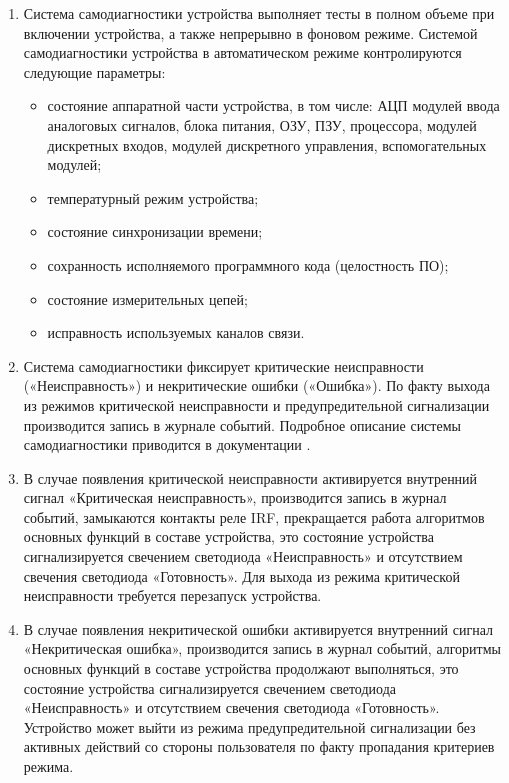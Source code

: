 \begin{enumerate}[label=\arabic{section}.\arabic{subsection}.\arabic*, labelsep=7pt, leftmargin=0pt, itemindent=60pt, align=left]
\begin{enumerate}
\item
Система самодиагностики устройства выполняет тесты в полном объеме при включении устройства, а также непрерывно в фоновом режиме.
Системой самодиагностики устройства в автоматическом режиме контролируются следующие параметры:
\begin{itemize}
\item состояние аппаратной части устройства, в том числе: АЦП модулей ввода аналоговых сигналов, блока питания, ОЗУ, ПЗУ, процессора, модулей дискретных входов, модулей дискретного управления, вспомогательных модулей;
\item температурный режим устройства;
\item состояние синхронизации времени;
\item сохранность исполняемого программного кода (целостность ПО);
\item состояние измерительных цепей;
\item исправность используемых каналов связи.
\end{itemize}

\item
Система самодиагностики фиксирует критические неисправности («Неисправность») и некритические ошибки («Ошибка»).
По факту выхода из режимов критической неисправности и предупредительной сигнализации производится запись в журнале событий.
Подробное описание системы самодиагностики приводится в документации \ManualUnitGeneral.

\item
В случае появления критической неисправности активируется внутренний сигнал «Критическая неисправность», производится запись в журнал событий, замыкаются контакты реле IRF, прекращается работа алгоритмов основных функций в составе устройства, это состояние устройства сигнализируется свечением светодиода «Неисправность» и отсутствием свечения светодиода «Готовность».
Для выхода из режима критической неисправности требуется перезапуск устройства.

\item
В случае появления некритической ошибки активируется внутренний сигнал «Некритическая ошибка», производится запись в журнал событий, алгоритмы основных функций в составе устройства продолжают выполняться, это состояние устройства сигнализируется свечением светодиода «Неисправность» и отсутствием свечения светодиода «Готовность».
Устройство может выйти из режима предупредительной сигнализации без активных действий со стороны пользователя по факту пропадания критериев режима.


\end{enumerate}
\end{enumerate}
